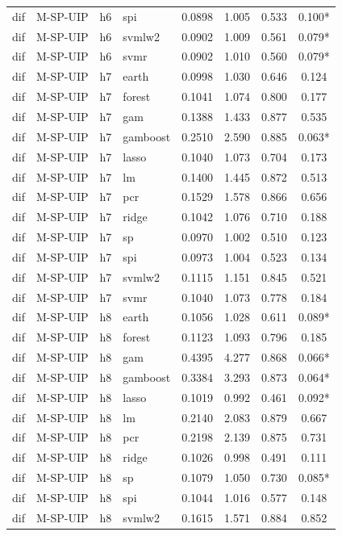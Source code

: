 \begin{ThreePartTable}
\begin{longtable}[t]{llclcccc}
dif & M-SP-UIP & h6 & spi & 0.0898 & 1.005 & 0.533 & 0.100*\\
dif & M-SP-UIP & h6 & svmlw2 & 0.0902 & 1.009 & 0.561 & 0.079*\\
dif & M-SP-UIP & h6 & svmr & 0.0902 & 1.010 & 0.560 & 0.079*\\
\addlinespace
dif & M-SP-UIP & h7 & earth & 0.0998 & 1.030 & 0.646 & 0.124\\
dif & M-SP-UIP & h7 & forest & 0.1041 & 1.074 & 0.800 & 0.177\\
dif & M-SP-UIP & h7 & gam & 0.1388 & 1.433 & 0.877 & 0.535\\
dif & M-SP-UIP & h7 & gamboost & 0.2510 & 2.590 & 0.885 & 0.063*\\
dif & M-SP-UIP & h7 & lasso & 0.1040 & 1.073 & 0.704 & 0.173\\
dif & M-SP-UIP & h7 & lm & 0.1400 & 1.445 & 0.872 & 0.513\\
dif & M-SP-UIP & h7 & pcr & 0.1529 & 1.578 & 0.866 & 0.656\\
dif & M-SP-UIP & h7 & ridge & 0.1042 & 1.076 & 0.710 & 0.188\\
dif & M-SP-UIP & h7 & sp & 0.0970 & 1.002 & 0.510 & 0.123\\
dif & M-SP-UIP & h7 & spi & 0.0973 & 1.004 & 0.523 & 0.134\\
dif & M-SP-UIP & h7 & svmlw2 & 0.1115 & 1.151 & 0.845 & 0.521\\
dif & M-SP-UIP & h7 & svmr & 0.1040 & 1.073 & 0.778 & 0.184\\
\addlinespace
dif & M-SP-UIP & h8 & earth & 0.1056 & 1.028 & 0.611 & 0.089*\\
dif & M-SP-UIP & h8 & forest & 0.1123 & 1.093 & 0.796 & 0.185\\
dif & M-SP-UIP & h8 & gam & 0.4395 & 4.277 & 0.868 & 0.066*\\
dif & M-SP-UIP & h8 & gamboost & 0.3384 & 3.293 & 0.873 & 0.064*\\
dif & M-SP-UIP & h8 & lasso & 0.1019 & 0.992 & 0.461 & 0.092*\\
dif & M-SP-UIP & h8 & lm & 0.2140 & 2.083 & 0.879 & 0.667\\
dif & M-SP-UIP & h8 & pcr & 0.2198 & 2.139 & 0.875 & 0.731\\
dif & M-SP-UIP & h8 & ridge & 0.1026 & 0.998 & 0.491 & 0.111\\
dif & M-SP-UIP & h8 & sp & 0.1079 & 1.050 & 0.730 & 0.085*\\
dif & M-SP-UIP & h8 & spi & 0.1044 & 1.016 & 0.577 & 0.148\\
dif & M-SP-UIP & h8 & svmlw2 & 0.1615 & 1.571 & 0.884 & 0.852\\

\end{longtable}
\end{ThreePartTable}
